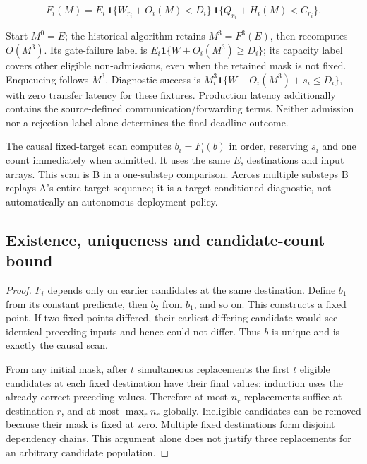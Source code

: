 \documentclass[11pt,a4paper]{article}
\begin{document}
\begin{equation}\tag{C1}\label{eq:C1}
 F_i(M)=E_i\,\mathbf{1}\{W_{r_i}+O_i(M)<D_i\}\,\mathbf{1}\{Q_{r_i}+H_i(M)<C_{r_i}\}.
\end{equation}

Start $M^{0}=E$; the historical algorithm retains $M^{3}=F^{3}(E)$, then recomputes $O(M^{3})$. Its gate-failure label is $E_i\mathbf{1}\{W+O_i(M^{3})\geq D_i\}$; its capacity label covers other eligible non-admissions, even when the retained mask is not fixed. Enqueueing follows $M^{3}$. Diagnostic success is $M_i^{3}\mathbf{1}\{W+O_i(M^{3})+s_i\leq D_i\}$, with zero transfer latency for these fixtures. Production latency additionally contains the source-defined communication/forwarding terms. Neither admission nor a rejection label alone determines the final deadline outcome.

The causal fixed-target scan computes $b_i=F_i(b)$ in order, reserving $s_i$ and one count immediately when admitted. It uses the same $E$, destinations and input arrays. This scan is B in a one-substep comparison. Across multiple substeps B replays A's entire target sequence; it is a target-conditioned diagnostic, not automatically an autonomous deployment policy.

\subsection{Existence, uniqueness and candidate-count bound}\label{sec:C.2}

\begin{proof}

$F_i$ depends only on earlier candidates at the same destination. Define $b_1$ from its constant predicate, then $b_2$ from $b_1$, and so on. This constructs a fixed point. If two fixed points differed, their earliest differing candidate would see identical preceding inputs and hence could not differ. Thus $b$ is unique and is exactly the causal scan.

From any initial mask, after $t$ simultaneous replacements the first $t$ eligible candidates at each fixed destination have their final values: induction uses the already-correct preceding values. Therefore at most $n_r$ replacements suffice at destination $r$, and at most $\max_r n_r$ globally. Ineligible candidates can be removed because their mask is fixed at zero. Multiple fixed destinations form disjoint dependency chains. This argument alone does not justify three replacements for an arbitrary candidate population.

\end{proof}
\end{document}
